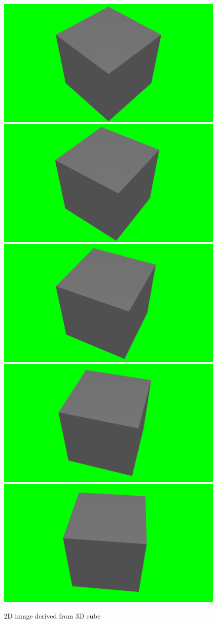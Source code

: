 \documentclass{report}
\begin{document}
\begin{figure}[h!]
\center
\includegraphics[width=.25\textwidth]{../images/cube_02/0001.png}
\includegraphics[width=.25\textwidth]{../images/cube_02/0010.png}
\includegraphics[width=.25\textwidth]{../images/cube_02/0020.png}
\includegraphics[width=.25\textwidth]{../images/cube_02/0030.png}
\includegraphics[width=.25\textwidth]{../images/cube_02/0040.png}
\caption[]{2D image derived from 3D cube}
\label{fig:2dCube2}
\end{figure}
\end{document}
